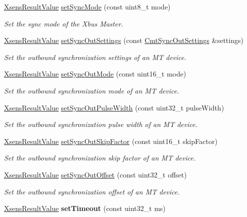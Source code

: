\begin{DoxyCompactItemize}
\hyperlink{group__enums_ga822a2260a20af524029eef9e9a51ff6f}{\-Xsens\-Result\-Value} \hyperlink{classxsens_1_1Cmt3_acca91e23b336810f6d08a3c2096ea306}{set\-Sync\-Mode} (const uint8\-\_\-t mode)
\begin{DoxyCompactList}\small\item\em \-Set the sync mode of the \-Xbus \-Master. \end{DoxyCompactList}\item 
\hyperlink{group__enums_ga822a2260a20af524029eef9e9a51ff6f}{\-Xsens\-Result\-Value} \hyperlink{classxsens_1_1Cmt3_a97a002712cf0fc2609f3770162f9b7a2}{set\-Sync\-Out\-Settings} (const \hyperlink{structCmtSyncOutSettings}{\-Cmt\-Sync\-Out\-Settings} \&settings)
\begin{DoxyCompactList}\small\item\em \-Set the outbound synchronization settings of an \-M\-T device. \end{DoxyCompactList}\item 
\hyperlink{group__enums_ga822a2260a20af524029eef9e9a51ff6f}{\-Xsens\-Result\-Value} \hyperlink{classxsens_1_1Cmt3_ae566270cf513881f4a12770ee52b2b03}{set\-Sync\-Out\-Mode} (const uint16\-\_\-t mode)
\begin{DoxyCompactList}\small\item\em \-Set the outbound synchronization mode of an \-M\-T device. \end{DoxyCompactList}\item 
\hyperlink{group__enums_ga822a2260a20af524029eef9e9a51ff6f}{\-Xsens\-Result\-Value} \hyperlink{classxsens_1_1Cmt3_adc3de05e611bd680cea8f21c9f38543e}{set\-Sync\-Out\-Pulse\-Width} (const uint32\-\_\-t pulse\-Width)
\begin{DoxyCompactList}\small\item\em \-Set the outbound synchronization pulse width of an \-M\-T device. \end{DoxyCompactList}\item 
\hyperlink{group__enums_ga822a2260a20af524029eef9e9a51ff6f}{\-Xsens\-Result\-Value} \hyperlink{classxsens_1_1Cmt3_aa8da49c9cdd4b6d226c0b8bb0ec9859f}{set\-Sync\-Out\-Skip\-Factor} (const uint16\-\_\-t skip\-Factor)
\begin{DoxyCompactList}\small\item\em \-Set the outbound synchronization skip factor of an \-M\-T device. \end{DoxyCompactList}\item 
\hyperlink{group__enums_ga822a2260a20af524029eef9e9a51ff6f}{\-Xsens\-Result\-Value} \hyperlink{classxsens_1_1Cmt3_a1fecc153b6431159003fd07b6375748d}{set\-Sync\-Out\-Offset} (const uint32\-\_\-t offset)
\begin{DoxyCompactList}\small\item\em \-Set the outbound synchronization offset of an \-M\-T device. \end{DoxyCompactList}\item 
\hypertarget{classxsens_1_1Cmt3_a6be69f04893fd1dfa91ea39f9f96a198}{\hyperlink{group__enums_ga822a2260a20af524029eef9e9a51ff6f}{\-Xsens\-Result\-Value} {\bfseries set\-Timeout} (const uint32\-\_\-t ms)}\label{classxsens_1_1Cmt3_a6be69f04893fd1dfa91ea39f9f96a198}


\end{DoxyCompactItemize}
